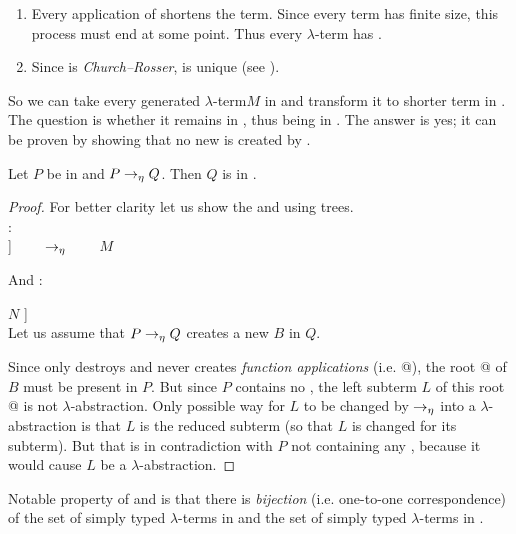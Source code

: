 \documentclass[12pt,a4paper]{report}
\newcommand{\Lets}{Let us\xspace}
\newcommand{\lets}{let us\xspace}
\newcommand{\lterm}{$\lambda$-term\xspace}
\newcommand{\lterms}{$\lambda$-terms\xspace}
\newcommand{\lh}[1]{\lambda #1}
\begin{document}
\begin{enumerate}
 \item Every application of \ered shortens the term.
       Since every term has finite size, this process must 
       end at some point. Thus every \lterm has \enf.
 \item Since \ered is \textit{Church–Rosser}, \enf is unique (see \cite{barendregt84}). 
\end{enumerate}

So we can take every generated \lterm $M$ in 
\lnf and transform it to shorter term in \enf. 
The question is whether it remains in \bnf, thus being in \benf.
The answer is yes; it can be proven by showing that no 
new \bredex is created by \ered.  

\begin{proposition}
Let $P$ be in \bnf and $P \rightarrow_\eta Q$. Then $Q$ is in \bnf.    
\end{proposition}
\begin{proof}

For better clarity \lets show the \ered and \bredex using trees.\\
\ered: \\

\Tree [.$\lh{x}$ [.@ $M$ $x$ ] ] 
~~~~$\rightarrow_\eta$~~~~
$M$ 

And \bredex:

\Tree [.@ [.$\lh{x}$ $M$ ] $N$ ] \\

\Lets assume that $P \rightarrow_\eta Q$ creates a new \bredex $B$ in $Q$.

Since \ered only destroys and never creates \textit{function applications} (i.e. @),
the root @ of $B$ must be present in $P$.  
But since $P$ contains no \bredex, the left subterm $L$ of this root @
is not $\lambda$-abstraction.
Only possible way for $L$ to be changed by $\rightarrow_\eta$ into 
a $\lambda$-abstraction is that $L$ is the reduced subterm (so that
$L$ is changed for its subterm).
But that is in contradiction with $P$ not containing any \bredex,
because it would cause $L$ be a $\lambda$-abstraction.

\end{proof}

Notable property of \lnf and \benf is that there is \textit{bijection} 
(i.e. one-to-one correspondence) of 
the set of simply typed \lterms in \lnf and 
the set of simply typed \lterms in \benf.
\end{document}
